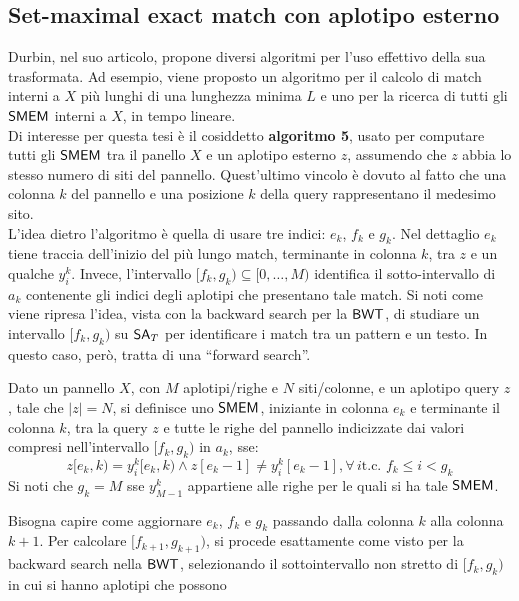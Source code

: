 \subsection{Set-maximal exact match con aplotipo esterno}
Durbin, nel suo articolo, propone diversi algoritmi per l'uso effettivo della
sua trasformata. Ad esempio, viene proposto un algoritmo per il calcolo
di match interni a $X$ più lunghi di una lunghezza minima $L$ e uno per la
ricerca di tutti gli $\mbox{\rm {\sf SMEM}}$ interni a $X$, in tempo lineare.\\
Di interesse per questa tesi è il cosiddetto \textbf{algoritmo 5}, usato
per computare tutti gli $\mbox{\rm {\sf SMEM}}$ tra il panello $X$ e un
aplotipo esterno $z$, assumendo che $z$ abbia lo stesso numero di siti del
pannello. Quest'ultimo vincolo è dovuto al fatto 
che una colonna $k$ del
pannello e una posizione $k$ della query rappresentano il medesimo sito.\\ 
L'idea dietro l'algoritmo è quella di usare tre indici: $e_k$, $f_k$ e
$g_k$. Nel dettaglio $e_k$ tiene traccia dell'inizio del più lungo match,
terminante in colonna $k$, tra $z$ e un qualche $y_i^k$. Invece, l'intervallo
$[f_k,g_k)\subseteq[0,\ldots,M)$ identifica il sotto-intervallo di
$a_k$ contenente gli indici degli aplotipi che presentano tale match. Si noti
come viene ripresa l'idea, vista con la backward search per la
$\mbox{\rm {\sf BWT}}$, di studiare un intervallo $[f_k,g_k)$ su $\mbox{\rm {\sf SA}}_T$ per identificare i
match tra un pattern e un testo. In questo caso, però, tratta di una
``forward search''.
\begin{definizione}
  Dato un pannello $X$, con $M$ aplotipi/righe e $N$ siti/colonne, e un aplotipo
  query $z$, tale che $|z|=N$, si definisce uno $\mbox{\rm {\sf SMEM}}$, iniziante in colonna
  $e_k$ e terminante il colonna 
  $k$, tra 
  la query $z$ e tutte le righe del pannello indicizzate dai valori compresi
  nell'intervallo $[f_k,g_k)$ in $a_k$, sse:
  \begin{equation}
    \label{eq:pbwtsmem}
    z[e_k,k)=y_i^k[e_k,k)\land z[e_k-1]\neq y_i^k[e_k-1], \forall\, i\mbox{
      t.c. }f_k\leq i < g_k
  \end{equation}
  Si noti che $g_k=M$ sse $y_{M-1}^k$ appartiene alle righe per le quali si ha
  tale $\mbox{\rm {\sf SMEM}}$.
\end{definizione}
Bisogna capire come aggiornare $e_k$, $f_k$ e $g_k$ passando dalla
colonna $k$ alla colonna $k+1$. Per calcolare $[f_{k+1},g_{k+1})$, si procede
esattamente come visto per la 
backward search nella $\mbox{\rm {\sf BWT}}$, selezionando il
sottointervallo non stretto di $[f_k,g_k)$ in cui si hanno aplotipi che possono
